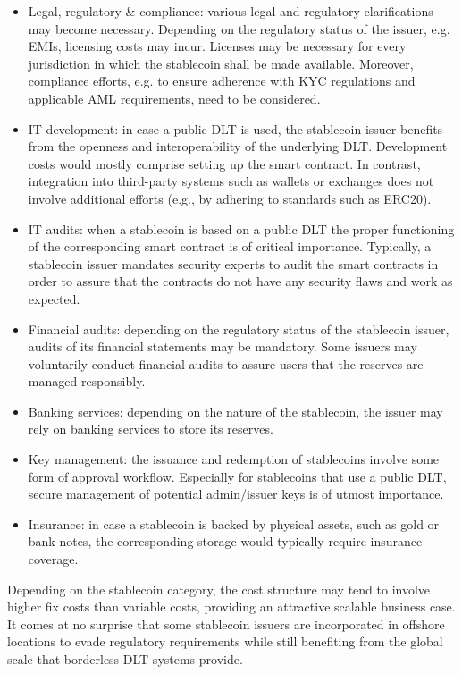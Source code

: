 \documentclass[conference]{IEEEtran}
\begin{document}
\begin{itemize}
	\item Legal, regulatory \& compliance: various legal and regulatory clarifications may become necessary. Depending on the regulatory status of the issuer, e.g. \acp{EMI}, licensing costs may incur. Licenses may be necessary for every jurisdiction in which the stablecoin shall be made available. Moreover, compliance efforts, e.g. to ensure adherence with \ac{KYC} regulations and applicable \ac{AML} requirements, need to be considered.
	\item IT development: in case a public \ac{DLT} is used, the stablecoin issuer benefits from the openness and interoperability of the underlying \ac{DLT}. Development costs would mostly comprise setting up the smart contract. In contrast, integration into third-party systems such as wallets or exchanges does not involve additional efforts (e.g., by adhering to standards such as ERC20). 
	\item IT audits: when a stablecoin is based on a public \ac{DLT} the proper functioning of the corresponding smart contract is of critical importance. Typically, a stablecoin issuer mandates security experts to audit the smart contracts in order to assure that the contracts do not have any security flaws and work as expected.
	\item Financial audits: depending on the regulatory status of the stablecoin issuer, audits of its financial statements may be mandatory. Some issuers may voluntarily conduct financial audits to assure users that the reserves are managed responsibly.
	\item Banking services: depending on the nature of the stablecoin, the issuer may rely on banking services to store its reserves.
	\item Key management: the issuance and redemption of stablecoins involve some form of approval workflow. Especially for stablecoins that use a public \ac{DLT}, secure management of potential admin/issuer keys is of utmost importance.
	\item Insurance: in case a stablecoin is backed by physical assets, such as gold or bank notes, the corresponding storage would typically require insurance coverage.
\end{itemize}

Depending on the stablecoin category, the cost structure may tend to involve higher fix costs than variable costs, providing an attractive scalable business case. It comes at no surprise that some stablecoin issuers are incorporated in offshore locations to evade regulatory requirements while still benefiting from the global scale that borderless \ac{DLT} systems provide. 
\end{document}
